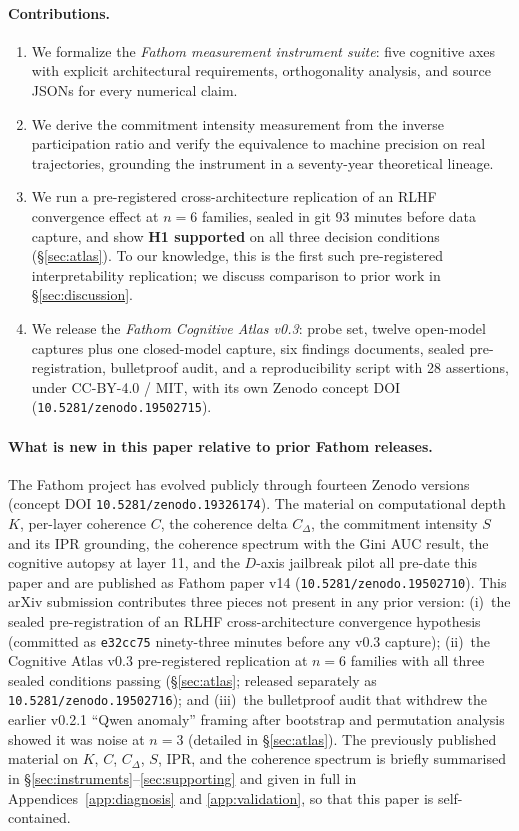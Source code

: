\documentclass[11pt,letterpaper]{article}
\begin{document}
\paragraph{Contributions.}
\begin{enumerate}[leftmargin=18pt,itemsep=2pt,topsep=3pt]
\item We formalize the \emph{Fathom measurement instrument suite}: five
cognitive axes with explicit architectural requirements, orthogonality
analysis, and source JSONs for every numerical claim.
\item We derive the commitment intensity measurement from the inverse
participation ratio and verify the equivalence to machine precision on real
trajectories, grounding the instrument in a seventy-year theoretical
lineage.
\item We run a pre-registered cross-architecture replication of an
RLHF convergence effect at $n\!=\!6$ families, sealed in git 93 minutes
before data capture, and show \textbf{H1 supported} on all three decision
conditions (\S\ref{sec:atlas}). To our knowledge, this is the first such
pre-registered interpretability replication; we discuss comparison to
prior work in \S\ref{sec:discussion}.
\item We release the \emph{Fathom Cognitive Atlas v0.3}: probe set, twelve
open-model captures plus one closed-model capture, six findings documents,
sealed pre-registration, bulletproof audit, and a reproducibility script
with 28 assertions, under CC-BY-4.0 / MIT, with its own Zenodo concept DOI
(\texttt{10.5281/zenodo.19502715}).
\end{enumerate}

\paragraph{What is new in this paper relative to prior Fathom releases.}
The Fathom project has evolved publicly through fourteen Zenodo versions
(concept DOI \texttt{10.5281/zenodo.19326174}). The material on
computational depth $K$, per-layer coherence $C$, the coherence delta
$C_\Delta$, the commitment intensity $S$ and its IPR grounding, the
coherence spectrum with the Gini AUC result, the cognitive autopsy at
layer 11, and the $D$-axis jailbreak pilot all pre-date this paper and
are published as Fathom paper v14
(\texttt{10.5281/zenodo.19502710}). This arXiv submission contributes three
pieces not present in any prior version: (i)~the sealed pre-registration
of an RLHF cross-architecture convergence hypothesis (committed as
\texttt{e32cc75} ninety-three minutes before any v0.3 capture);
(ii)~the Cognitive Atlas v0.3 pre-registered replication at $n\!=\!6$
families with all three sealed conditions passing
(\S\ref{sec:atlas}; released separately as
\texttt{10.5281/zenodo.19502716}); and (iii)~the bulletproof audit that
withdrew the earlier v0.2.1 ``Qwen anomaly'' framing after bootstrap and
permutation analysis showed it was noise at $n\!=\!3$ (detailed in
\S\ref{sec:atlas}). The previously published material on $K$, $C$,
$C_\Delta$, $S$, IPR, and the coherence spectrum is briefly summarised in
\S\ref{sec:instruments}--\ref{sec:supporting} and given in full in
Appendices~\ref{app:diagnosis} and \ref{app:validation}, so that this
paper is self-contained.
\end{document}
